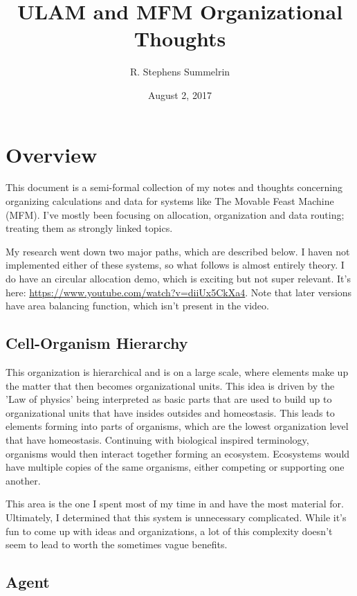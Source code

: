 \documentclass[article,12pt,oneside]{memoir}
\title{ULAM and MFM Organizational Thoughts}
\date{August 2, 2017}
\author{R. Stephens Summelrin}
\begin{document}
\maketitle
\tableofcontents

\pagebreak


\chapter{Overview}

This document is a semi-formal collection of my notes and thoughts concerning organizing calculations and data for systems like The Movable Feast Machine (MFM).
I've mostly been focusing on allocation, organization and data routing; treating them as strongly linked topics.

My research went down two major paths, which are described below.
I haven not implemented either of these systems, so what follows is almost entirely theory.
I do have an circular allocation demo, which is exciting but not super relevant.
It's here: \url{https://www.youtube.com/watch?v=diiUx5CkXa4}.
Note that later versions have area balancing function, which isn't present in the video.


\section{Cell-Organism Hierarchy}

This organization is hierarchical and is on a large scale, where elements make up the matter that then becomes organizational units.
This idea is driven by the 'Law of physics' being interpreted as basic parts that are used to build up to organizational units that have insides outsides and homeostasis.
This leads to elements forming into parts of organisms, which are the lowest organization level that have homeostasis.
Continuing with biological inspired terminology, organisms would then interact together forming an ecosystem.
Ecosystems would have multiple copies of the same organisms, either competing or supporting one another.

This area is the one I spent most of my time in and have the most material for.
Ultimately, I determined that this system is unnecessary complicated.
While it's fun to come up with ideas and organizations, a lot of this complexity doesn't seem to lead to worth the sometimes vague benefits.



\section{Agent}
\end{document}
